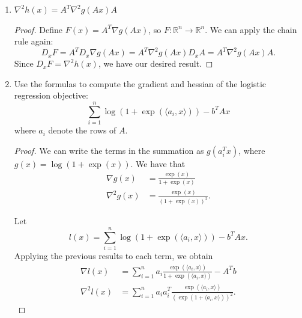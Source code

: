 \documentclass[11pt]{amsart}
\begin{document}
\begin{enumerate}
\begin{enumerate}
\begin{proof}
    The chain rule tells us that if $F(x) = G(H(x))$, then
    $D_x F = D_{H(x)} G \circ D_x H$. In this case, the composition operator is
    just matrix multiplication. We have that
    \begin{equation*}
      D_x h = D_{Ax} g \circ D_x A = D_{Ax} g \circ A,
    \end{equation*}
    which implies that
    \begin{align*}
      0
      &= \lim_{h \rightarrow 0} \frac{g(A(x + h)) - g(Ax) - \left(D_{Ax} g \circ A\right)h}{h} \\
      &= \lim_{h \rightarrow 0} \frac{g(A(x + h)) - g(Ax) - \langle A^T\left(D_{Ax} g\right)^T, h \rangle}{h} \\
      &= \lim_{h \rightarrow 0} \frac{g(A(x + h)) - g(Ax) - \langle A^T\nabla g(Ax), h \rangle}{h}.
    \end{align*}
    Thus, by definition, $\nabla h(x) = A^T \nabla g(Ax).$
  \end{proof}
\item $\nabla^2 h(x) = A^T \nabla^2 g(Ax) A$
  \begin{proof}
    Define $F(x) = A^T\nabla g(Ax)$, so
    $F: \mathbb{R}^n \rightarrow \mathbb{R}^n.$ We can apply the chain rule again:
    \begin{equation*}
      D_x F = A^T D_x  \nabla g(Ax) = A^T \nabla^2 g(Ax) D_xA = A^T \nabla^2 g(Ax) A.
    \end{equation*}
    Since $D_x F = \nabla^2 h(x)$, we have our desired result.    
  \end{proof}
\item Use the formulas to compute the gradient and hessian of the logistic regression objective: 
\[
\sum_{i=1}^n \log(1+\exp(\langle a_i, x\rangle))- b^TAx
\]
where $a_i$ denote the rows of $A$.

\begin{proof}
  We can write the terms in the summation as $g(a_i^Tx)$, where
  $g(x) = \log(1 + \exp(x))$. We have that
  \begin{align*}
    \nabla g(x) &= \frac{\exp(x)}{1 + \exp(x)} \\
    \nabla^2 g(x) &= \frac{\exp(x)}{\left(1 + \exp(x)\right)^2}.
  \end{align*}

  Let
  \begin{equation*}
    l(x) = \sum_{i=1}^n \log(1+\exp(\langle a_i, x\rangle))- b^TAx.
  \end{equation*}
  Applying the previous results to each term, we obtain
  \begin{align*}
    \nabla l(x) &= \sum_{i=1}^n a_i\frac{\exp(\langle a_i , x \rangle)}{1 + \exp(\langle a_i , x \rangle)} - A^Tb \\
    \nabla^2 l(x) &= \sum_{i=1}^n a_ia_i^T\frac{\exp(\langle a_i , x \rangle)}{\left(\exp(1 + \langle a_i , x \rangle)\right)^2}.
  \end{align*}
\end{proof}
\end{enumerate}


\end{enumerate}
\end{document}

